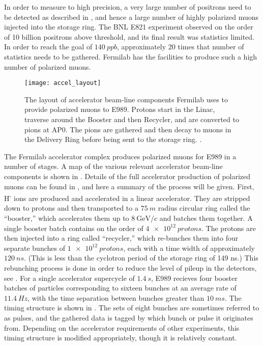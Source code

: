 
In order to measure \gmtwo to high precision, a very large number of positrons need to be detected as described in , and hence a large number of highly polarized muons injected into the storage ring. The BNL E821 experiment observed on the order of 10 billion positrons above threshold, and its final result was statistics limited. In order to reach the goal of $\SI{140}{ppb}$, approximately 20 times that number of statistics needs to be gathered. Fermilab has the facilities to produce such a high number of polarized muons.

\begin{figure}[]
    \centering
    \texttt{[image: accel\_layout]}
    \caption[Fermilab accelerator layout for muon delivery to E989]{The layout of accelerator beam-line components Fermilab uses to provide polarized muons to E989. Protons start in the Linac, traverse around the Booster and then Recycler, and are converted to pions at AP0. The pions are gathered and then decay to muons in the Delivery Ring before being sent to the \gmtwo storage ring. \cite{TDR}.}
    \label{fig:accelerator}
\end{figure}

The Fermilab accelerator complex produces polarized muons for E989 in a number of stages. A map of the various relevant accelerator beam-line components is shown in . Details of the full accelerator production of polarized muons can be found in , and here a summary of the process will be given. First, H\textsuperscript{-} ions are produced and accelerated in a linear accelerator. They are stripped down to protons and then transported to a $\SI{75}{m}$ radius circular ring called the ``booster,'' which accelerates them up to $\SI{8}{\GeV/c}$ and batches them together. A single booster batch contains on the order of $\SI{4e12}{protons}$. The protons are then injected into a ring called ``recycler,'' which re-bunches them into four separate bunches of $\SI{1e12}{protons}$, each with a time width of approximately $\SI{120}{ns}$. (This is less than the cyclotron period of the storage ring of 149 ns.) This rebunching process is done in order to reduce the level of pileup in the \gmtwo detectors, see . For a single accelerator supercycle of $\SI{1.4}{s}$, E989 recieves four booster batches of particles corresponding to sixteen bunches at an average rate of $\SI{11.4}{Hz}$, with the time separation between bunches greater than $\SI{10}{ms}$. The timing structure is shown in . The sets of eight bunches are sometimes referred to as pulses, and the gathered data is tagged by which bunch or pulse it originates from. Depending on the accelerator requirements of other experiments, this timing structure is modified appropriately, though it is relatively constant.

